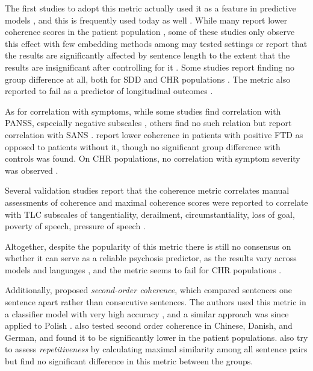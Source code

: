 The first studies to adopt this metric actually used it as a feature in predictive models \citep{bedi2015automated, rosenstein2015language}, and this is frequently used today as well \citep{sarzynska2021detecting, tang2022clinical, tang2023latent}. While many report lower coherence scores in the patient population \citep{iter2018automatic, just2019coherence, morgan2021natural, ryazanskaya2020thesis}, some of these studies only observe this effect with few embedding methods among may tested settings \citep{iter2018automatic, just2019coherence} or report that the results are significantly affected by sentence length to the extent that the results are insignificant after controlling for it \citep{just2019coherence}. Some studies report finding no group difference at all, both for SDD \citet{iter2018automatic, just2020modeling} and CHR populations \citep{hitczenko2021understanding, bilgrami2022construct, haas2020linking}. The metric also reported to fail as a predictor of longitudinal outcomes \citep{just2023validation}.

As for correlation with symptoms, while some studies find correlation with PANSS, especially negative subscales \citep{ryazanskaya2020thesis, just2023validation}, others find no such relation but report correlation with SANS \citep{parola2022speech}. \citet{just2020modeling} report lower coherence in patients with positive FTD as opposed to patients without it, though no significant group difference with controls was found. On CHR populations, no correlation with symptom severity was observed \citep{hitczenko2021understanding}.

Several validation studies report that the coherence metric correlates manual assessments of coherence \citep{xu2020centroid, xu2022fully} and maximal coherence scores were reported to correlate with TLC subscales of tangentiality, derailment, circumstantiality, loss of goal, poverty of speech, pressure of speech \citep{bilgrami2022construct}.

Altogether, despite the popularity of this metric there is still no consensus on whether it can serve as a reliable psychosis predictor, as the results vary across models \citep{iter2018automatic, just2019coherence, ryazanskaya2020thesis} and languages \citep{just2020modeling, parola2022speech}, and the metric seems to fail for CHR populations \citep{hitczenko2021understanding, bilgrami2022construct, haas2020linking}.


Additionally, \citet{bedi2015automated} proposed \textit{second-order coherence}, which compared sentences one sentence apart rather than consecutive sentences. The authors used this metric in a classifier model with very high accuracy \citep{bedi2015automated}, and a similar approach was since applied to Polish \citep{sarzynska2021detecting}. \citet{parola2022speech} also tested second order coherence in Chinese, Danish, and German, and found it to be significantly lower in the patient populations. \citet{morgan2021natural} also try to assess \textit{repetitiveness} by calculating maximal similarity among all sentence pairs but find no significant difference in this metric between the groups.


